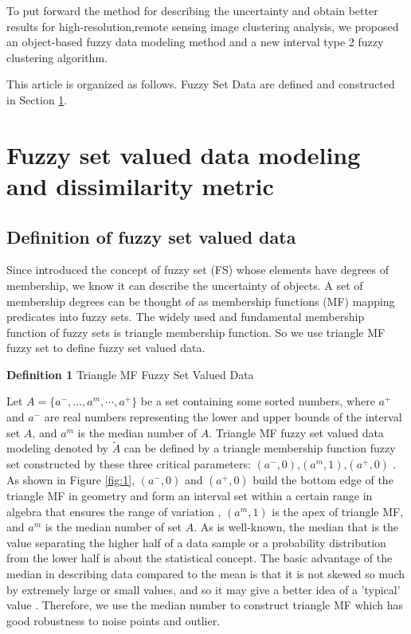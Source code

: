 \documentclass[preprint,12pt,authoryear]{elsarticle}
\begin{document}
To put forward the method for describing the uncertainty and obtain better results for high-resolution,remote sensing image clustering analysis, we proposed an object-based fuzzy data modeling method and a new interval type 2 fuzzy clustering algorithm.

This article is organized as follows. Fuzzy Set Data are defined  and constructed in Section \ref{sec:2}.

\section{Fuzzy set valued data modeling and dissimilarity metric}
\label{sec:2}

\subsection{Definition of fuzzy set valued data}
Since \cite{zadeh1965fuzzy} introduced the concept of fuzzy set (FS) whose elements have degrees of membership, we know it can describe the uncertainty of objects. A set of membership degrees can be thought of as membership functions (MF) mapping predicates into fuzzy sets. The widely used and fundamental membership function of fuzzy sets is triangle membership function. So we use triangle MF fuzzy set to define fuzzy set valued data.

\textbf{Definition 1} Triangle MF Fuzzy Set Valued Data

Let $A= \lbrace a^-,\dots,a^m,\cdots,a^+ \rbrace$ be a set containing some sorted numbers, where $a^+$ and $a^-$ are real numbers representing the lower and upper bounds of the interval  set $A$, and $a^m$ is the median number of $A$. Triangle MF fuzzy set valued data modeling denoted by $\tilde{A}$ can be defined by a triangle membership function fuzzy set constructed by these three critical parameters: $(a^-,0)$,$(a^m,1)$,$(a^+,0)$ . As shown in Figure \ref{fig:1}, $(a^-,0)$ and $(a^+,0)$ build the bottom edge of the triangle MF in geometry and form an interval set within a certain range in algebra that ensures the range of variation \citep{moore1966interval}, $(a^m,1)$ is the apex of triangle MF, and $a^m$ is the median number of set $A$. As is well-known, the median that is the value separating the higher half of a data sample or a probability distribution from the lower half is about the statistical concept. The basic advantage of the median in describing data compared to the mean is that it is not skewed so much by extremely large or small values, and so it may give a better idea of a 'typical' value \citep{bissell1994statistical}. Therefore, we use the median number to construct triangle MF which has good robustness to noise points and outlier.
\end{document}
